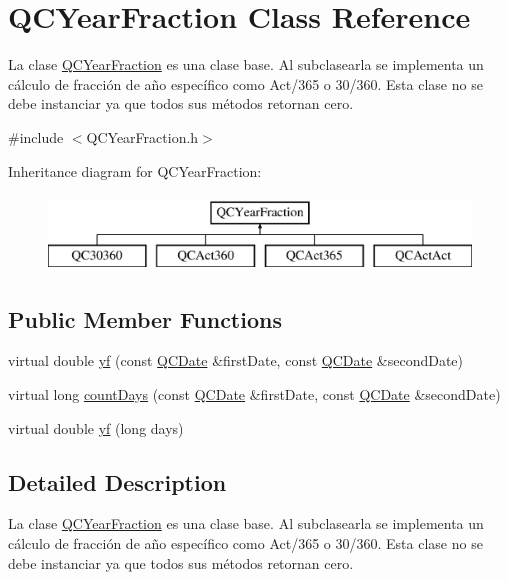 \hypertarget{class_q_c_year_fraction}{\section{Q\+C\+Year\+Fraction Class Reference}
\label{class_q_c_year_fraction}
}


La clase \hyperlink{class_q_c_year_fraction}{Q\+C\+Year\+Fraction} es una clase base. Al subclasearla se implementa un cálculo de fracción de año específico como Act/365 o 30/360. Esta clase no se debe instanciar ya que todos sus métodos retornan cero.  




{\ttfamily \#include $<$Q\+C\+Year\+Fraction.\+h$>$}

Inheritance diagram for Q\+C\+Year\+Fraction\+:\begin{figure}[H]
\begin{center}
\leavevmode
\includegraphics[height=2.000000cm]{class_q_c_year_fraction}
\end{center}
\end{figure}
\subsection*{Public Member Functions}
\begin{DoxyCompactItemize}
\item 
virtual double \hyperlink{class_q_c_year_fraction_abf6d0f4b18d13ce6d31104332511c200}{yf} (const \hyperlink{class_q_c_date}{Q\+C\+Date} \&first\+Date, const \hyperlink{class_q_c_date}{Q\+C\+Date} \&second\+Date)
\item 
virtual long \hyperlink{class_q_c_year_fraction_aca9bd1b20d467d0a516bd19f0ef680e7}{count\+Days} (const \hyperlink{class_q_c_date}{Q\+C\+Date} \&first\+Date, const \hyperlink{class_q_c_date}{Q\+C\+Date} \&second\+Date)
\item 
virtual double \hyperlink{class_q_c_year_fraction_ac8ae7d0408e01f1e58d8ab6afe1ced3f}{yf} (long days)
\end{DoxyCompactItemize}


\subsection{Detailed Description}
La clase \hyperlink{class_q_c_year_fraction}{Q\+C\+Year\+Fraction} es una clase base. Al subclasearla se implementa un cálculo de fracción de año específico como Act/365 o 30/360. Esta clase no se debe instanciar ya que todos sus métodos retornan cero. 

